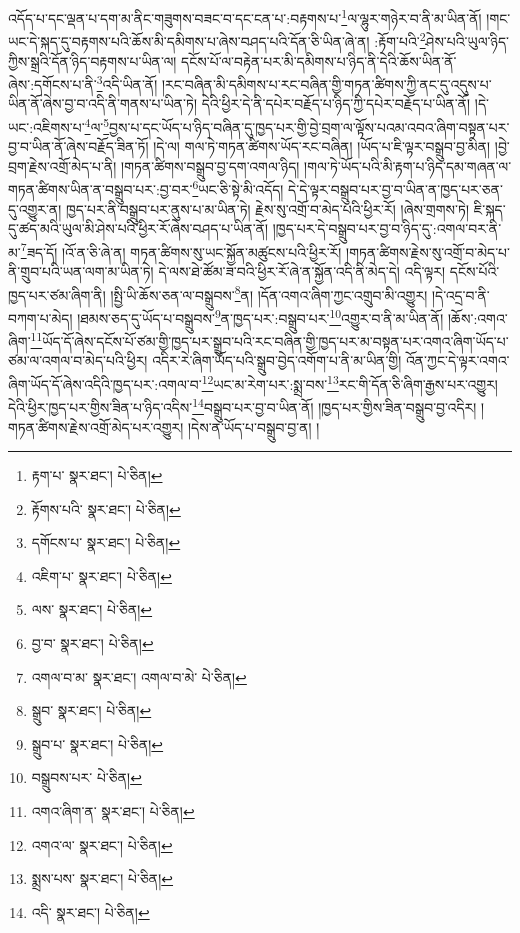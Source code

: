 འདོད་པ་དང་ལྡན་པ་དག་མ་ནིང་གཟུགས་བཟང་བ་དང་ངན་པ་:བརྟགས་པ་\footnote{རྟག་པ་  སྣར་ཐང་།  པེ་ཅིན། }ལ་ལྷུར་གཉེར་བ་ནི་མ་ཡིན་ནོ། །གང་ཡང་དེ་སྐད་དུ་བརྟགས་པའི་ཆོས་མི་དམིགས་པ་ཞེས་བཤད་པའི་དོན་ཅི་ཡིན་ཞེ་ན། :རྟོག་པའི་\footnote{རྟོགས་པའི་  སྣར་ཐང་།  པེ་ཅིན། }ཤེས་པའི་ཡུལ་ཉིད་ཀྱིས་སྒྲའི་དོན་ཉིད་བརྟགས་པ་ཡིན་ལ། དངོས་པོ་ལ་བརྟེན་པར་མི་དམིགས་པ་ཉིད་ནི་དེའི་ཆོས་ཡིན་ནོ་ཞེས་:དགོངས་པ་ནི་\footnote{དགོངས་པ་  སྣར་ཐང་།  པེ་ཅིན། }འདི་ཡིན་ནོ། །རང་བཞིན་མི་དམིགས་པ་རང་བཞིན་གྱི་གཏན་ཚིགས་ཀྱི་ནང་དུ་འདུས་པ་ཡིན་ནོ་ཞེས་བྱ་བ་འདི་ནི་གནས་པ་ཡིན་ཏེ། དེའི་ཕྱིར་དེ་ནི་དཔེར་བརྗོད་པ་ཉིད་ཀྱི་དཔེར་བརྗོད་པ་ཡིན་ནོ། །དེ་ཡང་:འཇིགས་པ་\footnote{འཇིག་པ་  སྣར་ཐང་།  པེ་ཅིན། }ལ་\footnote{ལས་  སྣར་ཐང་།  པེ་ཅིན། }བྱས་པ་དང་ཡོད་པ་ཉིད་བཞིན་དུ་ཁྱད་པར་གྱི་བྱེ་བྲག་ལ་ལྟོས་པའམ་འབའ་ཞིག་བསྟན་པར་བྱ་བ་ཡིན་ནོ་ཞེས་བརྗོད་ཟིན་ཏོ། །དེ་ལ། གལ་ཏེ་གཏན་ཚིགས་ཡོད་རང་བཞིན། །ཡོད་པ་ཇི་ལྟར་བསྒྲུབ་བྱ་མིན། །བྱེ་བྲག་རྗེས་འགྲོ་མེད་པ་ནི། །གཏན་ཚིགས་བསྒྲུབ་བྱ་དག་འགལ་ཉིད། །གལ་ཏེ་ཡོད་པའི་མི་རྟག་པ་ཉིད་དམ་གཞན་ལ་གཏན་ཚིགས་ཡིན་ན་བསྒྲུབ་པར་:བྱ་བར་\footnote{བྱ་བ་  སྣར་ཐང་།  པེ་ཅིན། }ཡང་ཅི་སྟེ་མི་འདོད། དེ་དེ་ལྟར་བསྒྲུབ་པར་བྱ་བ་ཡིན་ན་ཁྱད་པར་ཅན་དུ་འགྱུར་ན། ཁྱད་པར་ནི་བསྒྲུབ་པར་ནུས་པ་མ་ཡིན་ཏེ། རྗེས་སུ་འགྲོ་བ་མེད་པའི་ཕྱིར་རོ། །ཞེས་གྲགས་ཏེ། ཇི་སྐད་དུ་ཚད་མའི་ཡུལ་མི་ཤེས་པའི་ཕྱིར་རོ་ཞེས་བཤད་པ་ཡིན་ནོ། །ཁྱད་པར་དེ་བསྒྲུབ་པར་བྱ་བ་ཉིད་དུ་:འགལ་བར་ནི་མ་\footnote{འགལ་བ་མ་  སྣར་ཐང་། འགལ་བ་མེ་  པེ་ཅིན། }ཟད་དོ། །འོ་ན་ཅི་ཞེ་ན། གཏན་ཚིགས་སུ་ཡང་སྐྱོན་མཚུངས་པའི་ཕྱིར་རོ། །གཏན་ཚིགས་རྗེས་སུ་འགྲོ་བ་མེད་པ་ནི་གྲུབ་པའི་ཡན་ལག་མ་ཡིན་ཏེ། དེ་ལས་ཐེ་ཚོམ་ཟ་བའི་ཕྱིར་རོ་ཞེ་ན་སྐྱོན་འདི་ནི་མེད་དེ། འདི་ལྟར། དངོས་པོའི་ཁྱད་པར་ཙམ་ཞིག་ནི། །སྤྱི་ཡི་ཆོས་ཅན་ལ་བསྒྲུབས་\footnote{སྒྲུབ་  སྣར་ཐང་།  པེ་ཅིན། }ན། །དོན་འགའ་ཞིག་ཀྱང་འགྲུབ་མི་འགྱུར། །དེ་འདྲ་བ་ནི་བཀག་པ་མེད། །ཐམས་ཅད་དུ་ཡོད་པ་བསྒྲུབས་\footnote{སྒྲུབ་པ་  སྣར་ཐང་།  པེ་ཅིན། }ན་ཁྱད་པར་:བསྒྲུབ་པར་\footnote{བསྒྲུབས་པར་  པེ་ཅིན། }འགྱུར་བ་ནི་མ་ཡིན་ནོ། །ཆོས་:འགའ་ཞིག་\footnote{འགའ་ཞིག་ན་  སྣར་ཐང་།  པེ་ཅིན། }ཡོད་དོ་ཞེས་དངོས་པོ་ཙམ་གྱི་ཁྱད་པར་སྒྲུབ་པའི་རང་བཞིན་གྱི་ཁྱད་པར་མ་བསྟན་པར་འགའ་ཞིག་ཡོད་པ་ཙམ་ལ་འགལ་བ་མེད་པའི་ཕྱིར། འདིར་རེ་ཞིག་ཡོད་པའི་སྒྲུབ་བྱེད་འགོག་པ་ནི་མ་ཡིན་གྱི། འོན་ཀྱང་དེ་ལྟར་འགའ་ཞིག་ཡོད་དོ་ཞེས་འདིའི་ཁྱད་པར་:འགལ་བ་\footnote{འགའ་ལ་  སྣར་ཐང་།  པེ་ཅིན། }ཡང་མ་རེག་པར་:སྨྲ་བས་\footnote{སྨྲས་པས་  སྣར་ཐང་།  པེ་ཅིན། }རང་གི་དོན་ཅི་ཞིག་རྒྱས་པར་འགྱུར། དེའི་ཕྱིར་ཁྱད་པར་གྱིས་ཟིན་པ་ཉིད་འདིས་\footnote{འདི་  སྣར་ཐང་།  པེ་ཅིན། }བསྒྲུབ་པར་བྱ་བ་ཡིན་ནོ། །ཁྱད་པར་གྱིས་ཟིན་བསྒྲུབ་བྱ་འདིར། །གཏན་ཚིགས་རྗེས་འགྲོ་མེད་པར་འགྱུར། །དེས་ན་ཡོད་པ་བསྒྲུབ་བྱ་ན། །

